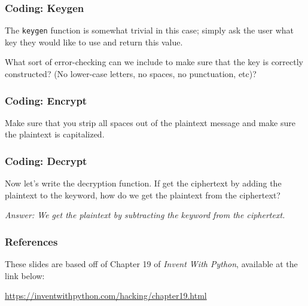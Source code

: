 \documentclass{beamer}
\newcommand{\<}{\langle}
\renewcommand{\>}{\rangle}
\begin{document}
\begin{frame}[fragile]
\frametitle{Coding: Keygen}

The \verb|keygen| function is somewhat trivial in this case; simply ask the user what key they would like to use and return this value. \newline

What sort of error-checking can we include to make sure that the key is correctly constructed? (No lower-case letters, no spaces, no punctuation, etc)?
\end{frame}


\begin{frame}[fragile]
\frametitle{Coding: Encrypt}

Make sure that you strip all spaces out of the plaintext message and make sure the plaintext is capitalized.

\end{frame}

\begin{frame}
\frametitle{Coding: Decrypt}

Now let's write the decryption function. If get the ciphertext by adding the plaintext to the keyword, how do we get the plaintext from the ciphertext?\newline

\emph{Answer: We get the plaintext by subtracting the keyword from the ciphertext.}
\end{frame}

\begin{frame}
\frametitle{References}

These slides are based off of Chapter 19 of \emph{Invent With Python}, available at the link below:
\begin{center}
\url{https://inventwithpython.com/hacking/chapter19.html}
\end{center}
\end{frame}
\end{document}
